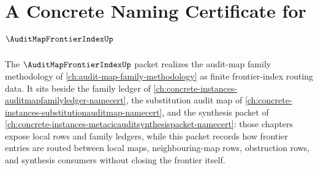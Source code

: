 \chapter{A Concrete Naming Certificate for $\AuditMapFrontierIndexUp$}
\label{ch:concrete-instances-audit-map-frontier-index-namecert}

The $\AuditMapFrontierIndexUp$ packet realizes the audit-map family methodology of \autoref{ch:audit-map-family-methodology} as finite frontier-index routing data. It sits beside the family ledger of \autoref{ch:concrete-instances-auditmapfamilyledger-namecert}, the substitution audit map of \autoref{ch:concrete-instances-substitutionauditmap-namecert}, and the synthesis packet of \autoref{ch:concrete-instances-metacicauditsynthesispacket-namecert}: those chapters expose local rows and family ledgers, while this packet records how frontier entries are routed between local maps, neighbouring-map rows, obstruction rows, and synthesis consumers without closing the frontier itself.

